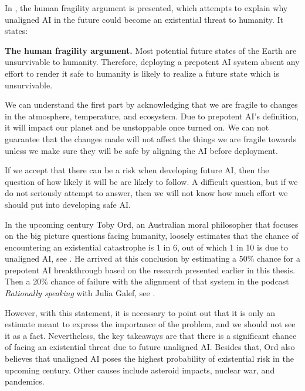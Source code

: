 \documentclass[12pt,A4]{report}
\theoremstyle{definition}
\begin{document}
In \citet[p.19]{CritchKruger}, the human fragility argument is presented, which attempts to explain why unaligned AI in the future could become an existential threat to humanity. It states:
\begin{displayquote}
\textbf{The human fragility argument.} 
Most potential future states of the Earth are unsurvivable to humanity. Therefore, deploying a prepotent AI system absent any effort to render it safe to humanity is likely to realize a future state which is unsurvivable.
\end{displayquote}
We can understand the first part by acknowledging that we are fragile to changes in the atmosphere, temperature, and ecosystem. Due to prepotent AI's definition, it will impact our planet and be unstoppable once turned on. We can not guarantee that the changes made will not affect the things we are fragile towards unless we make sure they will be safe by aligning the AI before deployment. 

If we accept that there can be a risk when developing future AI, then the question of how likely it will be are likely to follow. A difficult question, but if we do not seriously attempt to answer, then we will not know how much effort we should put into developing safe AI. 


In the upcoming century Toby Ord, an Australian moral philosopher that focuses on the big picture questions facing humanity, loosely estimates that the chance of encountering an existential catastrophe is 1 in 6, out of which 1 in 10 is due to unaligned  AI, see \citet[c.6]{Precipice}. He arrived at this conclusion by estimating a 50\% chance for a prepotent AI breakthrough based on the research presented earlier in this thesis. Then a 20\% chance of failure with the alignment of that system in the podcast \textit{Rationally speaking} with Julia Galef, see \citet[26:15]{RationallySpeaking}. 

However, with this statement, it is necessary to point out that it is only an estimate meant to express the importance of the problem, and we should not see it as a fact. Nevertheless, the key takeaways are that there is a significant chance of facing an existential threat due to future unaligned AI. Besides that, Ord also believes that unaligned AI poses the highest probability of existential risk in the upcoming century. Other causes include asteroid impacts, nuclear war, and pandemics. 
\end{document}
